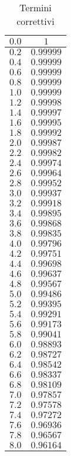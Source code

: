 \documentclass[]{article}
\begin{document}
\begin{table}
\begin{tabular}{||c|c||}
    $0.0$ & $1$ \\\hline
    $0.2$ & $0.99999$ \\\hline
    $0.4$ & $0.99999$ \\\hline
    $0.6$ & $0.99999$ \\\hline
    $0.8$ & $0.99999$ \\\hline
    $1.0$ & $0.99999$ \\\hline
    $1.2$ & $0.99998$ \\\hline
    $1.4$ & $0.99997$ \\\hline
    $1.6$ & $0.99995$ \\\hline
    $1.8$ & $0.99992$ \\\hline
    $2.0$ & $0.99987$ \\\hline
    $2.2$ & $0.99982$ \\\hline
    $2.4$ & $0.99974$ \\\hline
    $2.6$ & $0.99964$ \\\hline
    $2.8$ & $0.99952$ \\\hline
    $3.0$ & $0.99937$ \\\hline
    $3.2$ & $0.99918$ \\\hline
    $3.4$ & $0.99895$ \\\hline
    $3.6$ & $0.99868$ \\\hline
    $3.8$ & $0.99835$ \\\hline
    $4.0$ & $0.99796$ \\\hline
    $4.2$ & $0.99751$ \\\hline
    $4.4$ & $0.99698$ \\\hline
    $4.6$ & $0.99637$ \\\hline
    $4.8$ & $0.99567$ \\\hline
    $5.0$ & $0.99486$ \\\hline
    $5.2$ & $0.99395$ \\\hline
    $5.4$ & $0.99291$ \\\hline
    $5.6$ & $0.99173$ \\\hline
    $5.8$ & $0.99041$ \\\hline
    $6.0$ & $0.98893$ \\\hline
    $6.2$ & $0.98727$ \\\hline
    $6.4$ & $0.98542$ \\\hline
    $6.6$ & $0.98337$ \\\hline
    $6.8$ & $0.98109$ \\\hline
    $7.0$ & $0.97857$ \\\hline
    $7.2$ & $0.97578$ \\\hline
    $7.4$ & $0.97272$ \\\hline
    $7.6$ & $0.96936$ \\\hline
    $7.8$ & $0.96567$ \\\hline
    $8.0$ & $0.96164$ \\\hline

\end{tabular}
\caption{Termini correttivi}
\label{termine_correttivo}
\end{table}
\end{document}
